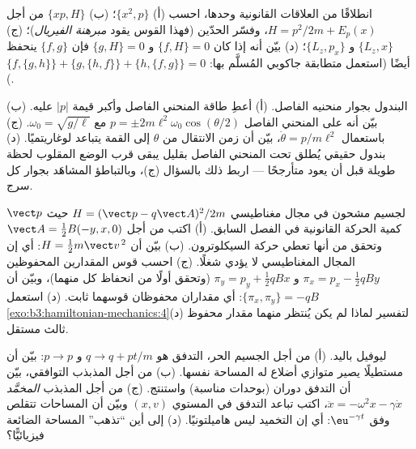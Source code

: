 \begin{exercise}[$\star$]\label{exo:b3:hamiltonian-mechanics:4}
انطلاقًا من العلاقات القانونية وحدها، احسب (أ) $\{x^2, p\}$؛ (ب)
$\{xp, H\}$ من أجل $H = p^2/2m + E_p(x)$، وفسّر الحدّين
(فهذا القوس يقود \emph{مبرهنة الفيريال})؛ (ج) $\{L_z, x\}$ و
$\{L_z, p_x\}$؛ (د) بيّن أنه إذا كان $\{f, H\} = 0$ و $\{g, H\} = 0$
فإن $\{f, g\}$ ينحفظ أيضًا (استعمل متطابقة جاكوبي المُسلَّم بها:
$\{f,\{g,h\}\} + \{g,\{h,f\}\} + \{h,\{f,g\}\} = 0$).
\end{exercise}

\begin{exercise}[$\star\star$]\label{exo:b3:hamiltonian-mechanics:5}
البندول بجوار منحنيه الفاصل. (أ) أعطِ طاقة المنحني الفاصل وأكبر
قيمة $|p|$ عليه. (ب) بيّن أنه على المنحني الفاصل $p =
\pm 2m\ell^2\omega_0\cos(\theta/2)$ مع $\omega_0 = \sqrt{g/\ell}$.
(ج) باستعمال $\dot\theta = p/m\ell^2$، بيّن أن زمن الانتقال من $\theta$
إلى القمة يتباعد لوغاريتميًا. (د) بندول حقيقي يُطلق تحت المنحني
الفاصل بقليل يبقى قرب الوضع المقلوب لحظة طويلة قبل أن يعود
متأرجحًا --- اربط ذلك بالسؤال (ج)، وبالتباطؤ المشاهَد بجوار كل
سرج.
\end{exercise}

\begin{exercise}[$\star\star$]\label{exo:b3:hamiltonian-mechanics:6}
لجسيم مشحون في مجال مغناطيسي  $H = (\vect p -
q\vect A)^2/2m$ حيث $\vect p$ كمية الحركة القانونية في الفصل
السابق. (أ) اكتب  من أجل $\vect A = \tfrac12
B(-y, x, 0)$ وتحقق من أنها تعطي حركة السيكلوترون. (ب) بيّن أن $H =
\tfrac12 m\vect v^{\,2}$: أي إن المجال المغناطيسي لا يؤدي شغلًا.
(ج) احسب قوس المقدارين المحفوظين $\pi_x = p_x - \tfrac12
qBy$ و $\pi_y = p_y + \tfrac12 qBx$ (وتحقق أولًا من انحفاظ كل
منهما)، وبيّن أن $\{\pi_x, \pi_y\} = -qB$: أي مقداران محفوظان
قوسهما ثابت. (د) استعمل
\cref{exo:b3:hamiltonian-mechanics:4}(د) لتفسير لماذا لم يكن
يُنتظر منهما مقدار محفوظ ثالث مستقل.
\end{exercise}

\begin{exercise}[$\star\star$]\label{exo:b3:hamiltonian-mechanics:7}
ليوفيل باليد. (أ) من أجل الجسيم الحر، التدفق هو $q \to q +
pt/m$ و $p \to p$: بيّن أن مستطيلًا يصير متوازي أضلاع له المساحة
نفسها. (ب) من أجل المذبذب التوافقي، بيّن أن التدفق دوران
(بوحدات مناسبة) واستنتج. (ج) من أجل المذبذب \emph{المخمَّد}
$\ddot x = -\omega^2x - \gamma\dot x$، اكتب تباعد التدفق في
المستوي $(x, v)$ وبيّن أن المساحات تتقلص وفق $\eu^{-\gamma t}$: أي
إن التخميد ليس هاميلتونيًا. (د) إلى أين ``تذهب'' المساحة الضائعة
فيزيائيًّا؟
\end{exercise}

